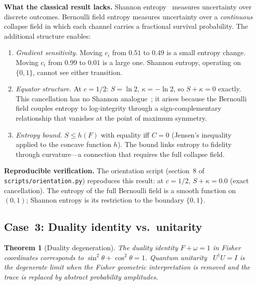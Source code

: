 \documentclass[
  aps,
  prd,
  twocolumn,
  superscriptaddress,
  nofootinbib,
  floatfix
]{revtex4-2}
\newtheorem{theorem}{Theorem}
\begin{document}
\noindent\textbf{What the classical result lacks.}
Shannon entropy~\cite{shannon1948,cover2006elements} measures
uncertainty over discrete outcomes.  Bernoulli field entropy
measures uncertainty over a \emph{continuous} collapse field
in which each channel carries a fractional survival probability.
The additional structure enables:
\begin{enumerate}[leftmargin=*,label=(\alph*)]
\item \emph{Gradient sensitivity.}  Moving $c_i$ from $0.51$
  to $0.49$ is a small entropy change.  Moving $c_i$ from
  $0.99$ to $0.01$ is a large one.  Shannon entropy, operating
  on $\{0,1\}$, cannot see either transition.
\item \emph{Equator structure.}  At $c = 1/2$:
  $S = \ln 2$, $\kappa = -\ln 2$, so $S + \kappa = 0$ exactly.
  This cancellation has no Shannon analogue~\cite{shannon1948};
  it arises because the Bernoulli field couples entropy to
  log-integrity through a sign-complementary relationship that
  vanishes at the point of maximum symmetry.
\item \emph{Entropy bound.}  $S \leq h(F)$ with equality iff
  $C = 0$ (Jensen's inequality applied to the concave function
  $h$).  The bound links entropy to fidelity through curvature---a
  connection that requires the full collapse field.
\end{enumerate}

\noindent\textbf{Reproducible verification.}
The orientation script (section~8 of
\texttt{scripts/orientation.py}) reproduces this result: at
$c = 1/2$, $S + \kappa = 0.0$ (exact cancellation).  The
entropy of the full Bernoulli field is a smooth function on
$(0,1)$; Shannon entropy is its restriction to the boundary
$\{0,1\}$.

\subsection{Case~3: Duality identity vs.\ unitarity}

\begin{theorem}[Duality degeneration]
\label{thm:duality_deg}
The duality identity $F + \omega = 1$ in Fisher coordinates
corresponds to $\sin^2\theta + \cos^2\theta = 1$.
Quantum unitarity~\cite{dirac1930principles,vonforthcoming,weinberg1995qft1}
$U^\dagger U = I$ is the degenerate limit when the Fisher
geometric interpretation is removed and the trace is replaced
by abstract probability amplitudes.
\end{theorem}
\end{document}
